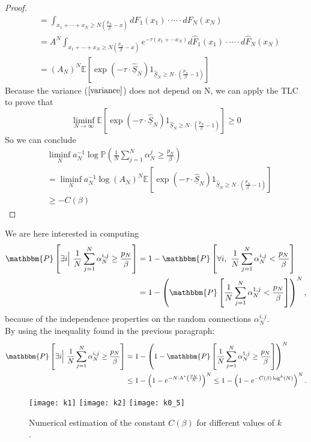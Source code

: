 \begin{proof}
\begin{align*}
&=\int_{x_1+\cdots+x_N\geq N\left(\frac{p_N}{\beta}-x\right)} dF_1(x_1)\cdot\cdots\cdot dF_N(x_N)\\
&=A^N\int_{x_1+\cdots+x_N\geq N\left(\frac{p_N}{\beta}-x\right)}e^{-\tau (x_1+\cdots x_N)} d\hat{F}_1(x_1)\cdot\cdots\cdot d\hat{F}_N(x_N)\\
& = (A_N)^N\mathbb{E}\left[\exp(-\tau\cdot \underline{\hat{S}}_N)1_{\underline{\hat{S}}_N\geq N\cdot(\frac{p_N}{\beta}-1)}\right]
\end{align*}
Because the variance ($\ref{variance}$) does not depend on N, we can apply the TLC to prove that
\[\liminf_{N\rightarrow \infty}\mathbb{E}\left[\exp(-\tau\cdot \underline{\hat{S}}_N)1_{\underline{\hat{S}}_N\geq N\cdot(\frac{p_N}{\beta}-1)}\right]\geq 0\]
So we can conclude
\begin{align*}
&\liminf_{N} a_N^{-1}\log{\mathbb{P} \left( \frac{1}{N} \sum_{j = 1}^N \alpha^{j}_N \geq \frac{p_N}{\beta}\right)}\\
&=\liminf_{N} a_N^{-1}\log{(A_N)^N\mathbb{E}\left[\exp(-\tau\cdot \underline{\hat{S}}_N)1_{\underline{\hat{S}}_N\geq N\cdot(\frac{p_N}{\beta}-1)}\right]}\\
&\geq-C(\beta)
\end{align*}
\end{proof}


\begin{remark}

We are here interested in computing \begin{align*} \mathbbm{P} \left[ \exists i \Big| \ \frac{1}{N} \sum_{j = 1}^N \alpha^{i, j}_N \geq \frac{p_N}{\beta} \right] &= 1 - \mathbbm{P} \left[ \forall i, \ \frac{1}{N} \sum_{j = 1}^N \alpha^{i, j}_N < \frac{p_N}{\beta} \right] \\ &= 1 - \left( \mathbbm{P} \left[ \frac{1}{N} \sum_{j = 1}^N \alpha^{1, j}_N < \frac{p_N}{\beta} \right] \right)^N, \end{align*} because of the independence properties on the random connections $\alpha^{i, j}_N$. \\

By using the inequality found in the previous paragraph:
\begin{align*} \mathbbm{P} \left[ \exists i \Big| \ \frac{1}{N} \sum_{j = 1}^N \alpha^{i, j}_N \geq \frac{p_N}{\beta} \right] &= 1 - \left( 1 - \mathbbm{P} \left[ \frac{1}{N} \sum_{j = 1}^N \alpha^{1, j}_N \geq \frac{p_N}{\beta} \right] \right)^N \\ &\leq 1 - \left( 1 - e^{-N \cdot \Lambda^* \left( \frac{p_N}{N} \right)} \right)^N \leq 1 - \left( 1 - e^{-C(\beta) \log^k (N)} \right)^N. \end{align*}
\end{remark}

\begin{figure}
\subfigure
{\texttt{[image: k1]}}
\subfigure
{\texttt{[image: k2]}}
\centering
\subfigure
{\texttt{[image: k0\_5]}}
\caption{Numerical estimation of the constant $C(\beta)$ for different values of $k$.}
\end{figure}